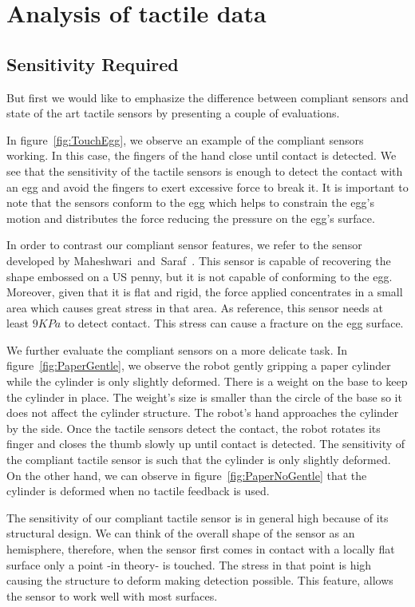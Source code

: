 \section{Analysis of tactile data}


\subsection{Sensitivity Required}

But first we would like to emphasize the difference between
compliant sensors and state of the art tactile sensors by
presenting a couple of evaluations.

In figure~\ref{fig:TouchEgg}, we observe an example of the
compliant sensors working. In this case, the fingers of the hand
close until contact is detected. We see that the sensitivity of
the tactile sensors is enough to detect the contact with an egg
and avoid the fingers to exert excessive force to break it. It is
important to note that the sensors conform to the egg which helps
to constrain the egg's motion and distributes the force reducing
the pressure on the egg's surface.

In order to contrast our compliant sensor features, we refer to
the sensor developed by
Maheshwari~and~Saraf~\cite{touchsensorScience}. This sensor is
capable of recovering the shape embossed on a US penny, but it is
not capable of conforming to the egg. Moreover, given that it is
flat and rigid, the force applied concentrates in a small area
which causes great stress in that area. As reference, this sensor
needs at least $9KPa$ to detect contact. This stress can cause a
fracture on the egg surface.

We further evaluate the compliant sensors on a more delicate task.
In figure~\ref{fig:PaperGentle}, we observe the robot gently
gripping a paper cylinder while the cylinder is only slightly
deformed. There is a weight on the base to keep the cylinder in
place. The weight's size is smaller than the circle of the base so
it does not affect the cylinder structure. The robot's hand
approaches the cylinder by the side. Once the tactile sensors
detect the contact, the robot rotates its finger and closes the
thumb slowly up until contact is detected. The sensitivity of the
compliant tactile sensor is such that the cylinder is only
slightly deformed. On the other hand, we can observe in
figure~\ref{fig:PaperNoGentle} that the cylinder is deformed when
no tactile feedback is used.

The sensitivity of our compliant tactile sensor is in general high
because of its structural design. We can think of the overall
shape of the sensor as an hemisphere, therefore, when the sensor
first comes in contact with a locally flat surface only a point
-in theory- is touched. The stress in that point is high causing
the structure to deform making detection possible. This feature,
allows the sensor to work well with most surfaces.

